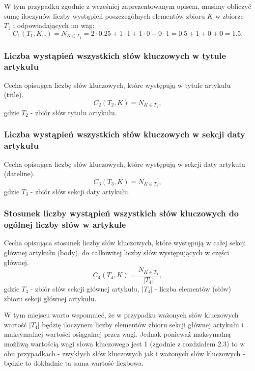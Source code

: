\documentclass{classrep}
\begin{document}
W tym przypadku zgodnie z wcześniej zaprezentowanym opisem, musimy obliczyć sumę iloczynów liczby wystąpień poszczególnych elementów zbioru $K$ w zbiorze $T_{1}$ i odpowiadających im wag:
\begin{equation}
 C_{1}(T_{1},K_{w}) =  N_{K \in T_{1}} = 2 \cdot 0.25 + 1 \cdot 1 + 1 \cdot 0 + 0 \cdot 1 = 0.5 + 1 + 0 + 0 = 1.5.
 \end{equation}	

\subsubsection{Liczba wystąpień wszystkich słów kluczowych w tytule artykułu}
Cecha opisująca liczbę słów kluczowych, które występują w tytule artykułu (title).
\begin{equation}
            C_{2}(T_{2},K) = N_{K \in T_{2}},
 \end{equation}	
 gdzie $T_{2}$ - zbiór słów tytułu artykułu.

\subsubsection{Liczba wystąpień wszystkich słów kluczowych w sekcji daty artykułu}

Cecha opisująca liczbę słów kluczowych, które występują w sekcji daty artykułu (dateline).
\begin{equation}
            C_{3}(T_{3},K) = N_{K \in T_{3}},
 \end{equation}	
 gdzie $T_{3}$ - zbiór słów sekcji daty artykułu.

\subsubsection{Stosunek liczby wystąpień wszystkich słów kluczowych do ogólnej liczby słów w artykule}
Cecha opisująca stosunek liczby słów kluczowych, które występują w całej sekcji głównej artykułu (body), do całkowitej liczby słów występujących w części głównej.
\begin{equation}
            C_{4}(T_{4},K) = \frac{N_{K \in T_{4}}} {|T_{4}|},
 \end{equation}	
 gdzie $T_{4}$ - zbiór słów sekcji głównej artykułu, $|T_{4}|$ - liczba elementów (słów) zbioru sekcji głównej artykułu. \newline

W tym miejscu warto wspomnieć, że w przypadku ważonych słów kluczowych wartość $|T_{4}|$ będzię iloczynem liczby elementów zbioru sekcji głównej artykułu i maksymalnej wartości osiągalnej przez wagi. Jednak ponieważ maksymalną możliwą wartością wagi słowa kluczowego jest 1 (zgodnie z rozdziałem 2.3) to w obu przypadkach - zwykłych słów kluczowych jak i ważonych słów kluczowych - będzie to dokładnie ta sama wartość liczbowa.
\end{document}
